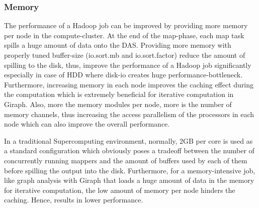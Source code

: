 \documentclass[conference]{IEEEtran}
\begin{document}
\subsubsection {Memory}
The performance of a Hadoop job can be improved by providing more memory per node in the compute-cluster. 
At the end of the map-phase, each map task spills a huge amount of data onto the DAS. 
Providing more memory with properly tuned buffer-size (io.sort.mb and io.sort.factor) reduce the amount of spilling to the disk, thus, improve the performance of a Hadoop job significantly especially in case of HDD where disk-io creates huge performance-bottleneck.
Furthermore, increasing memory in each node improves the caching effect during the computation which is extremely beneficial for iterative computation in Giraph.
Also, more the memory modules per node, more is the number of memory channels, thus increasing the access parallelism of the processors in each node which can also improve the overall performance.

In a traditional Supercomputing environment, normally, 2GB per core is used as a standard configuration which obviously poses a tradeoff between the number of concurrently running mappers and the amount of buffers used by each of them before spilling the output into the disk. 
Furthermore, for a memory-intensive job, like graph analysis with Giraph that loads a huge amount of data in the memory for iterative computation, the low amount of memory per node hinders the caching. Hence, results in lower performance.

\end{document}
